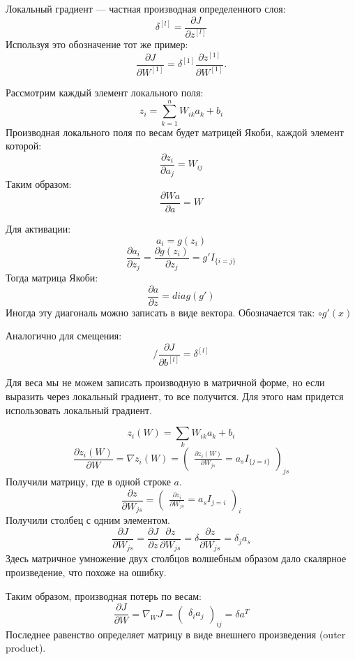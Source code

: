 Локальный градиент --- частная производная определенного слоя:
\[
    \delta^{[l]} = \frac{\partial J}{\partial z^{[l]}}
\]
Используя это обозначение тот же пример:
\[
    \frac{\partial J}{\partial W^{[1]}} = \delta^{[1]} \frac{\partial
    z^{[1]}}{\partial W^{[1]}}. 
\]

Рассмотрим каждый элемент локального поля:
\[
    z_i = \sum_{k=1}^n W_{ik} a_{k} + b_{i}
\]
Производная локального поля по весам будет матрицей Якоби, каждой элемент
которой:
\[
    \frac{\partial z_i}{\partial a_j} = W_{ij}
\]
Таким образом:
\[
    \frac{\partial Wa}{\partial a} = W
\]

Для активации:
\[
    a_i = g(z_i)
\]
\[
    \frac{\partial a_i}{\partial z_j} = \frac{\partial g(z_i)}{\partial z_j} =
    g' I_{\{i=j\}}
\]
Тогда матрица Якоби:
\[
    \frac{\partial a}{\partial z} = diag(g')
\]
Иногда эту диагональ можно записать в виде вектора. Обозначается так: $\circ
g'(x)$

Аналогично для смещения:
\[
    
\]
\[
/    \frac{\partial J}{\partial b^{[l]}} = \delta^{[l]}
\]

Для веса мы не можем записать производную в матричной форме, но если выразить
через локальный градиент, то все получится. Для этого нам
придется использовать локальный градиент.

\[
    z_i(W) = \sum_k W_{ik} a_k + b_i
\]
\[
    \frac{\partial z_i(W)}{\partial W} = \nabla z_i(W) =
    \begin{pmatrix}
        \frac{\partial z_i(W)}{\partial W_{js}} = a_s I_{\{j=i\}}
    \end{pmatrix}_{js}
\]
Получили матрицу, где в одной строке $a$.
\[
    \frac{\partial z}{\partial W_{js}} =
    \begin{pmatrix}
        \frac{\partial z_i}{\partial W_{js}} = a_s I_{j=i}
    \end{pmatrix}_{i}
\]
Получили столбец с одним элементом.
\[
    \frac{\partial J}{\partial W_{js}} = \frac{\partial J}{\partial z}
    \frac{\partial z}{\partial W_{js}} =
    \delta \frac{\partial z}{\partial W_{js}} =
    \delta_j a_s
\]
Здесь матричное умножение двух столбцов волшебным образом дало скалярное
произведение, что похоже на ошибку.

Таким образом, производная потерь по весам:
\[
    \frac{\partial J}{\partial W} = \nabla_W J =
    \begin{pmatrix}
        \delta_i a_j
    \end{pmatrix}_{ij} = \delta a^T
\]
Последнее равенство определяет матрицу в виде внешнего произведения (outer
product).

